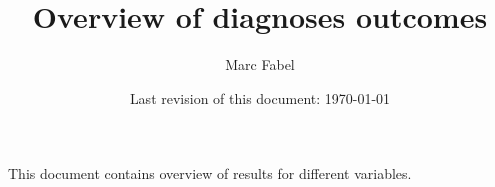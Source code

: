 \documentclass[11pt, a4paper]{scrartcl} %
\author{Marc Fabel}
\title{Overview of diagnoses outcomes}
\date{Last revision of this document: \today}
\begin{document}
\maketitle
This document contains overview of results for different variables. 


%
%
%
%
\end{document}
